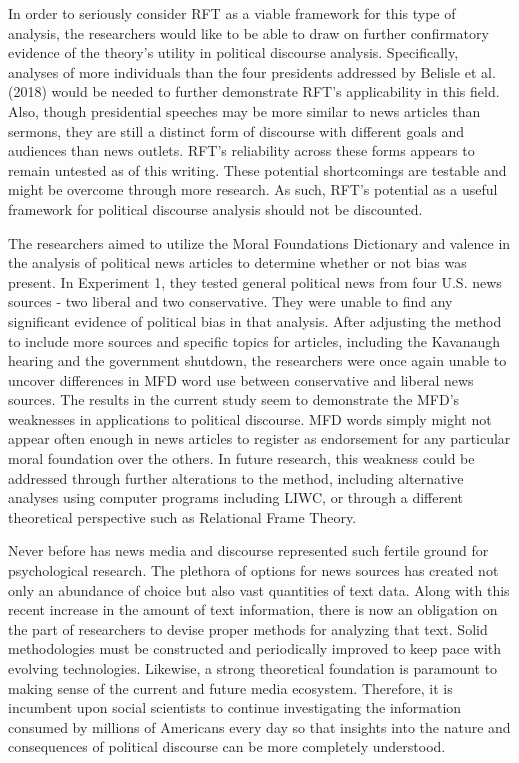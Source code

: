\documentclass[english,,man]{apa6}
\begin{document}
In order to seriously consider RFT as a viable framework for this type
of analysis, the researchers would like to be able to draw on further
confirmatory evidence of the theory's utility in political discourse
analysis. Specifically, analyses of more individuals than the four
presidents addressed by Belisle et al. (2018) would be needed to further
demonstrate RFT's applicability in this field. Also, though presidential
speeches may be more similar to news articles than sermons, they are
still a distinct form of discourse with different goals and audiences
than news outlets. RFT's reliability across these forms appears to
remain untested as of this writing. These potential shortcomings are
testable and might be overcome through more research. As such, RFT's
potential as a useful framework for political discourse analysis should
not be discounted.

The researchers aimed to utilize the Moral Foundations Dictionary and
valence in the analysis of political news articles to determine whether
or not bias was present. In Experiment 1, they tested general political
news from four U.S. news sources - two liberal and two conservative.
They were unable to find any significant evidence of political bias in
that analysis. After adjusting the method to include more sources and
specific topics for articles, including the Kavanaugh hearing and the
government shutdown, the researchers were once again unable to uncover
differences in MFD word use between conservative and liberal news
sources. The results in the current study seem to demonstrate the MFD's
weaknesses in applications to political discourse. MFD words simply
might not appear often enough in news articles to register as
endorsement for any particular moral foundation over the others. In
future research, this weakness could be addressed through further
alterations to the method, including alternative analyses using computer
programs including LIWC, or through a different theoretical perspective
such as Relational Frame Theory.

Never before has news media and discourse represented such fertile
ground for psychological research. The plethora of options for news
sources has created not only an abundance of choice but also vast
quantities of text data. Along with this recent increase in the amount
of text information, there is now an obligation on the part of
researchers to devise proper methods for analyzing that text. Solid
methodologies must be constructed and periodically improved to keep pace
with evolving technologies. Likewise, a strong theoretical foundation is
paramount to making sense of the current and future media ecosystem.
Therefore, it is incumbent upon social scientists to continue
investigating the information consumed by millions of Americans every
day so that insights into the nature and consequences of political
discourse can be more completely understood.
\end{document}
